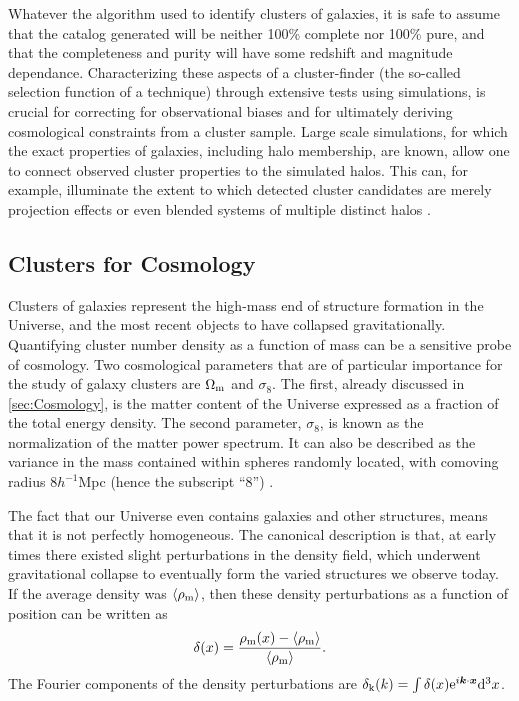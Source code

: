 Whatever the algorithm used to identify clusters of galaxies, it is safe to assume that the catalog generated will be neither 100\% complete nor 100\% pure, and that the completeness and purity will have some redshift and magnitude dependance. Characterizing these aspects of a cluster-finder (the so-called selection function of a technique) through extensive tests using simulations, is crucial for correcting for observational biases and for ultimately deriving cosmological constraints from a cluster sample. Large scale simulations, for which the exact properties of galaxies, including halo membership, are known, allow one to connect observed cluster properties to the simulated halos. This can, for example, illuminate the extent to which detected cluster candidates are merely projection effects or even blended systems of multiple distinct halos \citep{Cohn07}.

\subsection{Clusters for Cosmology}
\label{sec:ClusterCosmo}
Clusters of galaxies represent the high-mass end of structure formation in the Universe, and the most recent objects to have collapsed gravitationally. Quantifying cluster number density as a function of mass can be a sensitive probe of cosmology. Two cosmological parameters that are of particular importance for the study of galaxy clusters are $\Omega_{\rm m}$ and $\sigma_8$. The first, already discussed in \autoref{sec:Cosmology}, is the matter content of the Universe expressed as a fraction of the total energy density. The second parameter, $\sigma_8$, is known as the normalization of the matter power spectrum. It can also be described as the variance in the mass contained within spheres randomly located, with comoving radius $8 h^{-1}$Mpc (hence the subscript ``8'') \citep{DavisPeebles83,White93}.

The fact that our Universe even contains galaxies and other structures, means that it is not perfectly homogeneous. The canonical description is that, at early times there existed slight perturbations in the density field, which underwent gravitational collapse to eventually form the varied structures we observe today. If the average density was $\langle \rho_{\rm m} \rangle$, then these density perturbations as a function of position can be written as
\begin{equation}
\delta(x) = \frac{\rho_{\rm m}(x) - \langle \rho_{\rm m} \rangle}{\langle \rho_{\rm m} \rangle}.
\end{equation}
The Fourier components of the density perturbations are $\delta_{\rm k}(k) = \int \delta(x) {\rm e}^{i {\bm k} \cdot {\bm x}}{\rm d}^3x$. 

